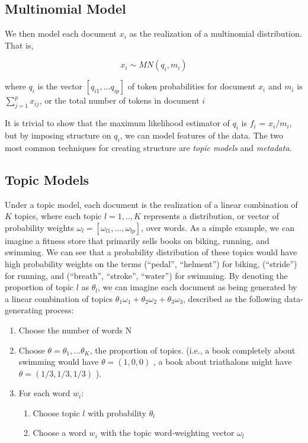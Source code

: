 \documentclass[12pt]{article}
\begin{document}
\subsection{Multinomial Model}\label{multinomial-model}

We then model each document $x_i$ as the realization of a multinomial
distribution. That is,

\[ x_{i} \sim MN(q_i,m_i) \]

where $q_i$ is the vector $[q_{i1}, \dots q_{ip}]$ of token
probabilities for document $x_i$ and $m_i$ is
$\sum_{j = 1}^{p}{x_{ij}}$, or the total number of tokens in document
$i$

It is trivial to show that the maximum likelihood estimator of $q_i$ is
$f_i$ = $x_i / m_i$, but by imposing structure on $q_i$, we can model
features of the data. The two most common techniques for creating
structure are \emph{topic models} and \emph{metadata}.

\subsection{Topic Models}\label{topic-models}

Under a topic model, each document is the realization of a
linear combination of $K$ topics, where each topic $l = 1,..,K$ represents a
distribution, or vector of probability weights
$\omega_l = [\omega_{l1}, ... , \omega_{lp}]$, over words. As a simple
example, we can imagine a fitness store that primarily sells books on
biking, running, and swimming. We can see that a probability
distribution of these topics would have high probability weights on the
terms (``pedal'', ``helment'') for biking, (``stride'') for running, and
(``breath'', ``stroke'', ``water'') for swimming. By denoting the
proportion of topic $l$ as $\theta_l$, we can imagine each document as
being generated by a linear combination of topics
$\theta_1 \omega_1  + \theta_2 \omega_2 + \theta_3 \omega_3 $, described
as the following data-generating process:


\begin{enumerate}
\item 
Choose the number of words N 
\item
  Choose $\theta = \theta_1,...\theta_K$, the proportion of topics.
  (i.e., a book completely about swimming would have $\theta=(1,0,0)$ ,
  a book about triathalons might have $\theta =(1/3,1/3,1/3)$ ).
\item
  For each word $w_i$:
\begin{enumerate}
\item Choose topic $l$ with probability $\theta_l$
\item
Choose  a word $w_{i}$ with the topic word-weighting vector $\omega_l$
\end{enumerate}
\end{enumerate}
\end{document}
